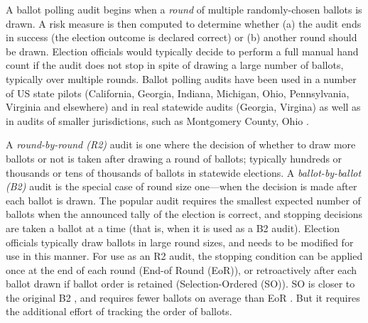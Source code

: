 A ballot polling audit begins when a {\em round} \cite{usenix_minerva} of multiple randomly-chosen ballots is drawn. A risk measure is then computed to determine whether (a) the audit ends in success (the election outcome is declared correct) or (b) another round should be drawn. Election officials would typically decide to perform a full manual hand count if the audit does not stop in spite of drawing a large number of ballots, typically over multiple rounds. Ballot polling audits have been used in a number of US state pilots (California, Georgia, Indiana, Michigan, Ohio, Pennsylvania, Virginia and elsewhere) and in real statewide audits (Georgia, Virgina) \cite{vv_audits} as well as in audits of smaller jurisdictions, such as Montgomery County, Ohio \cite{usenix_minerva}. 

A {\em round-by-round (R2)} audit is one where the decision of whether to draw more ballots or not is taken after drawing a round of ballots; typically hundreds or thousands or tens of thousands of ballots in statewide elections. A {\em ballot-by-ballot (B2)} audit is the special case of round size one---when the decision is made after each ballot is drawn. The popular \BRAVO audit requires the smallest expected number of ballots when the announced tally of the election is correct, and stopping decisions are taken a ballot at a time (that is, when it is used as a B2 audit). Election officials typically draw ballots in large round sizes, and \BRAVO needs to be modified for use in this manner. For use as an R2 audit, the \BRAVO stopping condition can be applied once at the end of each round (End-of Round (EoR)), or retroactively after each ballot drawn if ballot order is retained (Selection-Ordered (SO)). SO \BRAVO is closer to the original B2 \BRAVO, and requires fewer ballots on average than EoR \BRAVO. But it requires the additional effort of tracking the order of ballots. 

